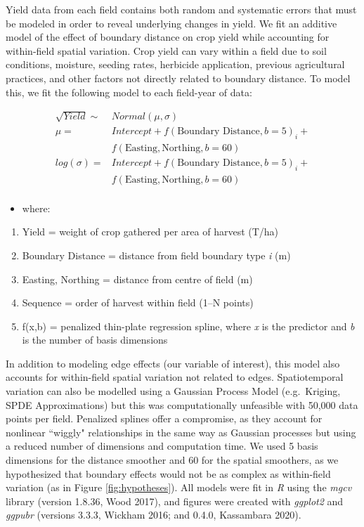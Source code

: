 \documentclass[]{elsarticle} %
\providecommand{\tightlist}{%
  \setlength{\itemsep}{0pt}\setlength{\parskip}{0pt}}
\begin{document}
Yield data from each field contains both random and systematic errors that must be modeled in order to reveal underlying changes in yield.
We fit an additive model of the effect of boundary distance on crop yield while accounting for within-field spatial variation.
Crop yield can vary within a field due to soil conditions, moisture, seeding rates, herbicide application, previous agricultural practices, and other factors not directly related to boundary distance.
To model this, we fit the following model to each field-year of data:

\begin{equation}
  \begin{split}
  \sqrt{Yield} \sim & Normal (\mu, \sigma)\\
  \mu = & Intercept + f(\text{Boundary Distance}, b=5)_i + \\
   & f(\text{Easting}, \text{Northing}, b=60)\\
  log(\sigma) =  & Intercept + f(\text{Boundary Distance}, b=5)_i + \\
   & f(\text{Easting}, \text{Northing}, b=60)\\
  \end{split}
  \end{equation}

\begin{itemize}
\tightlist
\item
  where:
\end{itemize}

\begin{enumerate}
\def\labelenumi{\arabic{enumi}.}
\tightlist
\item
  Yield = weight of crop gathered per area of harvest (T/ha)
\item
  Boundary Distance = distance from field boundary type \emph{i} (m)
\item
  Easting, Northing = distance from centre of field (m)
\item
  Sequence = order of harvest within field (1--N points)
\item
  f(x,b) = penalized thin-plate regression spline, where \emph{x} is the predictor and \emph{b} is the number of basis dimensions
\end{enumerate}

In addition to modeling edge effects (our variable of interest), this model also accounts for within-field spatial variation not related to edges.
Spatiotemporal variation can also be modelled using a Gaussian Process Model (e.g.~Kriging, SPDE Approximations) but this was computationally unfeasible with 50,000 data points per field.
Penalized splines offer a compromise, as they account for nonlinear ``wiggly" relationships in the same way as Gaussian processes but using a reduced number of dimensions and computation time.
We used 5 basis dimensions for the distance smoother and 60 for the spatial smoothers, as we hypothesized that boundary effects would not be as complex as within-field variation (as in Figure \ref{fig:hypotheses}).
All models were fit in \emph{R} using the \emph{mgcv} library (version 1.8.36, Wood 2017), and figures were created with \emph{ggplot2} and \emph{ggpubr} (versions 3.3.3, Wickham 2016; and 0.4.0, Kassambara 2020).
\end{document}
